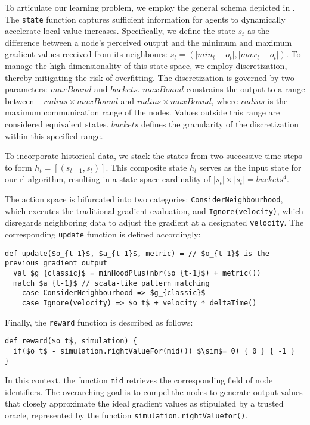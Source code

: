 To articulate our learning problem, 
 we employ the general schema depicted in . 
 The \lstinline|state| function captures sufficient information for agents to dynamically accelerate local value increases. 
 Specifically, we define the state \( s_t \) as the difference between a node's perceived output and the minimum and maximum gradient values received from its neighbours: \( s_t = (|min_t - o_t|, |max_t - o_t|) \). 
 To manage the high dimensionality of this state space, we employ discretization, thereby mitigating the risk of overfitting. 
 The discretization is governed by two parameters: 
 \( maxBound \) and \( buckets \). 
 \( maxBound \) constrains the output to a range between \( - radius \times maxBound \) and \( radius \times maxBound \), where \( radius \) is the maximum communication range of the nodes. 
 Values outside this range are considered equivalent states. 
 \( buckets \) defines the granularity of the discretization within this specified range.

To incorporate historical data, 
 we stack the states from two successive time steps to form \( h_t = [(s_{t - 1}, s_t)] \). 
 This composite state \( h_t \) serves as the input state for our \ac{rl} algorithm, 
 resulting in a state space cardinality of \( |s_t| \times |s_t| = buckets^4 \).

The action space is bifurcated into two categories: 
 \texttt{ConsiderNeighbourhood}, 
 which executes the traditional gradient evaluation, and \texttt{Ignore(velocity)}, 
 which disregards neighboring data to adjust the gradient at a designated \texttt{velocity}. 
 The corresponding \texttt{update} function is defined accordingly:
\begin{lstlisting}[mathescape]
def update($o_{t-1}$, $a_{t-1}$, metric) = // $o_{t-1}$ is the previous gradient output
  val $g_{classic}$ = minHoodPlus(nbr($o_{t-1}$) + metric())
  match $a_{t-1}$ // scala-like pattern matching
    case ConsiderNeighbourhood => $g_{classic}$
    case Ignore(velocity) => $o_t$ + velocity * deltaTime() 
\end{lstlisting}
%
Finally, the \texttt{reward} function is described as follows: 
\begin{lstlisting}[mathescape]
def reward($o_t$, simulation) {
  if($o_t$ - simulation.rightValueFor(mid()) $\sim$= 0) { 0 } { -1 }
}
\end{lstlisting}
In this context, the function \lstinline|mid| retrieves the corresponding field of node identifiers. 
 The overarching goal is to compel the nodes to generate output values that closely approximate the ideal gradient values as stipulated by a trusted oracle, represented by the function \lstinline|simulation.rightValuefor()|.

